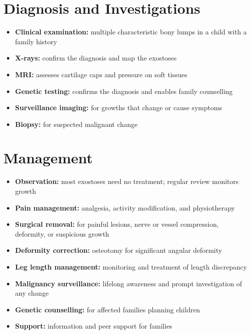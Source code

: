 \section*{Diagnosis and Investigations}
\begin{itemize}
    \item \textbf{Clinical examination:} multiple characteristic bony lumps in a child with a family history
    \item \textbf{X-rays:} confirm the diagnosis and map the exostoses
    \item \textbf{MRI:} assesses cartilage caps and pressure on soft tissues
    \item \textbf{Genetic testing:} confirms the diagnosis and enables family counselling
    \item \textbf{Surveillance imaging:} for growths that change or cause symptoms
    \item \textbf{Biopsy:} for suspected malignant change
\end{itemize}

\section*{Management}
\begin{itemize}
    \item \textbf{Observation:} most exostoses need no treatment; regular review monitors growth
    \item \textbf{Pain management:} analgesia, activity modification, and physiotherapy
    \item \textbf{Surgical removal:} for painful lesions, nerve or vessel compression, deformity, or suspicious growth
    \item \textbf{Deformity correction:} osteotomy for significant angular deformity
    \item \textbf{Leg length management:} monitoring and treatment of length discrepancy
    \item \textbf{Malignancy surveillance:} lifelong awareness and prompt investigation of any change
    \item \textbf{Genetic counselling:} for affected families planning children
    \item \textbf{Support:} information and peer support for families
\end{itemize}

